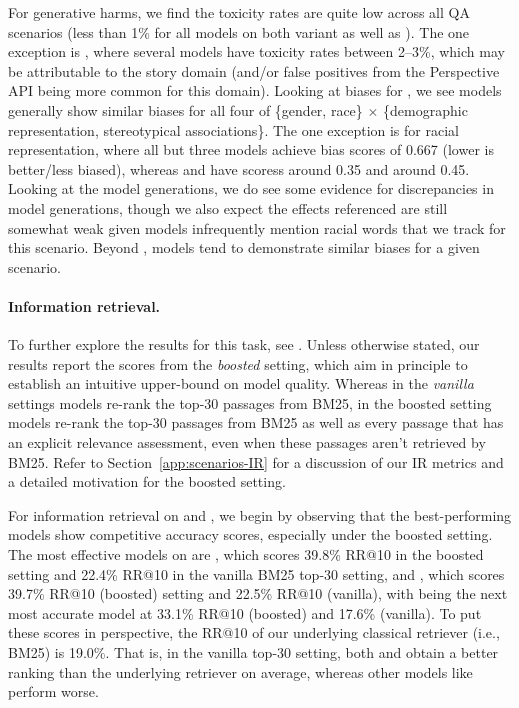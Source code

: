 For generative harms, we find the toxicity rates are quite low across all QA scenarios (\eg less than 1\% for all models on both \naturalquestions variant as well as \quac). 
The one exception is \narrativeqa, where several models have toxicity rates between 2--3\%, which may be attributable to the story domain (and/or false positives from the Perspective API being more common for this domain). 
Looking at biases for \narrativeqa, we see models generally show similar biases for all four of \{gender, race\} $\times$ \{demographic representation, stereotypical associations\}. 
The one exception is for racial representation, where all but three models achieve bias scores of 0.667 (lower is better/less biased), whereas \ultwo and \tfive have scoress around 0.35 and \yalm around 0.45. 
Looking at the model generations, we do see some evidence for discrepancies in model generations, though we also expect the effects referenced are still somewhat weak given models infrequently mention racial words that we track for this scenario.
Beyond \narrativeqa, models tend to demonstrate similar biases for a given scenario.

\paragraph{Information retrieval.}
To further explore the results for this task, see . Unless otherwise stated, our results report the scores from the \textit{boosted} setting, which aim in principle to establish an intuitive upper-bound on model quality. Whereas in the \textit{vanilla} settings models re-rank the top-30 passages from BM25, in the boosted setting models re-rank the top-30 passages from BM25 as well as every passage that has an explicit relevance assessment, even when these passages aren't retrieved by BM25. Refer to Section~\ref{app:scenarios-IR} for a discussion of our IR metrics and a detailed motivation for the boosted setting.

For information retrieval on \msmarcoregular and \msmarcotrec, we begin by observing that the best-performing models show competitive accuracy scores, especially under the boosted setting. The most effective models on \msmarcoregular are
\instructdavinci, which scores 39.8\% RR@10 in the boosted setting and 22.4\% RR@10 in the vanilla BM25 top-30 setting, and \mtnlgfivethreezero, which scores 39.7\% RR@10 (boosted) setting and 22.5\% RR@10 (vanilla), with \coherexl being the next most accurate model at 33.1\% RR@10 (boosted) and 17.6\% (vanilla). To put these scores in perspective, the RR@10 of our underlying classical retriever (i.e., BM25) is 19.0\%. That is, in the vanilla top-30 setting, both \instructdavinci and \mtnlgfivethreezero obtain a better ranking than the underlying retriever on average, whereas other models like \coherexl perform worse. 

